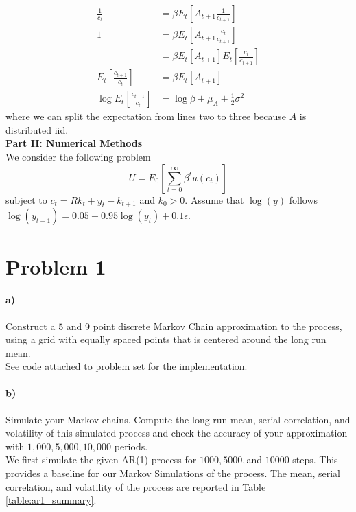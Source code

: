 \documentclass[11pt,letter]{article}
\begin{document}
\begin{align*}
\frac{1}{c_t} 	&= \beta E_t\left[ A_{t+1} \frac{1}{c_{t+1}} \right]\\
1				&= \beta E_t\left[ A_{t+1} \frac{c_t}{c_{t+1}} \right]\\
&= \beta E_t\left[ A_{t+1}\right] E_t\left[ \frac{c_t}{c_{t+1}} \right] \\
E_t\left[ \frac{c_{t+1}}{c_{t}} \right] &= \beta E_t\left[ A_{t+1} \right]\\
\log E_t\left[ \frac{c_{t+1}}{c_{t}} \right] &= \log \beta + \mu_A + \frac{1}{2}\sigma^2
\end{align*}
where we can split the expectation from lines two to three because $A$ is distributed iid. \\


\noindent\textbf{Part II: Numerical Methods}\\
We consider the following problem
\begin{equation*}
U = E_0\left[ \sum_{t = 0}^{\infty} \beta^t u(c_t)\right] 
\end{equation*}
subject to $c_t = Rk_t + y_t - k_{t+1}$ and $ k_0 > 0$. 
Assume that $\log(y)$ follows $\log(y_{t+1}) = 0.05 + 0.95 \log(y_t) + 0.1\epsilon$. 
\section*{Problem 1} 

\paragraph{a)} Construct a $5$ and $9$ point discrete Markov Chain approximation to the process, using a grid with equally spaced points that is centered around the long run mean. \\

See code attached to problem set for the implementation.\\

\paragraph{b)} Simulate your Markov chains. Compute the long run mean, serial correlation, and volatility of this simulated process and check the accuracy of your approximation with $1,000, 5,000, 10,000$ periods. \\

We first simulate the given AR(1) process for $1000, 5000,$and $10000$ steps. This provides a baseline for our Markov Simulations of the process. The mean, serial correlation, and volatility of the process are reported in Table \ref{table:ar1_summary}.
\end{document}
